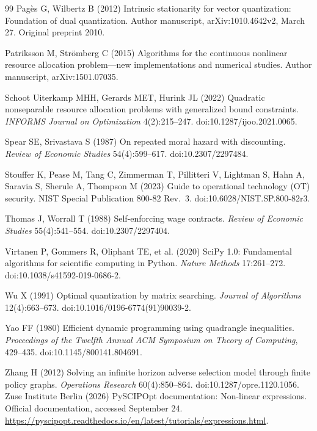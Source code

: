 \begin{thebibliography}{99}
Pag\`es G, Wilbertz B (2012) Intrinsic stationarity for vector quantization: Foundation of dual quantization. Author manuscript, arXiv:1010.4642v2, March 27. Original preprint 2010.

Patriksson M, Str{\"o}mberg C (2015) Algorithms for the continuous nonlinear resource allocation problem---new implementations and numerical studies. Author manuscript, arXiv:1501.07035.

Schoot Uiterkamp MHH, Gerards MET, Hurink JL (2022) Quadratic nonseparable resource allocation problems with generalized bound constraints. \emph{INFORMS Journal on Optimization} 4(2):215--247. doi:10.1287/ijoo.2021.0065.

Spear SE, Srivastava S (1987) On repeated moral hazard with discounting. \emph{Review of Economic Studies} 54(4):599--617. doi:10.2307/2297484.

Stouffer K, Pease M, Tang C, Zimmerman T, Pillitteri V, Lightman S, Hahn A, Saravia S, Sherule A, Thompson M (2023) Guide to operational technology (OT) security. NIST Special Publication 800-82 Rev.~3. doi:10.6028/NIST.SP.800-82r3.

Thomas J, Worrall T (1988) Self-enforcing wage contracts. \emph{Review of Economic Studies} 55(4):541--554. doi:10.2307/2297404.

Virtanen P, Gommers R, Oliphant TE, et al. (2020) SciPy 1.0: Fundamental algorithms for scientific computing in Python. \emph{Nature Methods} 17:261--272. doi:10.1038/s41592-019-0686-2.

Wu X (1991) Optimal quantization by matrix searching. \emph{Journal of Algorithms} 12(4):663--673. doi:10.1016/0196-6774(91)90039-2.

Yao FF (1980) Efficient dynamic programming using quadrangle inequalities. \emph{Proceedings of the Twelfth Annual ACM Symposium on Theory of Computing}, 429--435. doi:10.1145/800141.804691.

Zhang H (2012) Solving an infinite horizon adverse selection model through finite policy graphs. \emph{Operations Research} 60(4):850--864. doi:10.1287/opre.1120.1056.
Zuse Institute Berlin (2026) PySCIPOpt documentation: Non-linear expressions. Official documentation, accessed September 24. \url{https://pyscipopt.readthedocs.io/en/latest/tutorials/expressions.html}.
\end{thebibliography}
